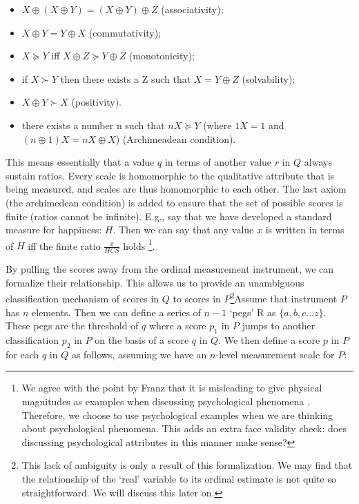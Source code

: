 \documentclass[utf8]{FrontiersinVancouver}
\begin{document}
\begin{itemize}
    \item $X \oplus (X \oplus Y) = (X \oplus Y) \oplus Z$ (associativity);
    \item $X \oplus Y = Y \oplus X$ (commutativity);
    \item $X \succeq Y$ iff $X \oplus Z \succeq Y \oplus Z$ (monotonicity);
    \item if $X \succ Y$ then there exists a Z such that $X = Y \oplus Z$ (solvability);
    \item $X \oplus Y \succ X$ (positivity).
    \item there exists a number n such that $nX \succeq Y$ (where $1X = 1$ and $(n \oplus 1) X = nX \oplus X$) (Archimeadean condition).
\end{itemize}

This means essentially that a value $q$ in terms of another value $r$ in $Q$ always sustain ratios. Every scale is homomorphic to the qualitative attribute that is being measured, and scales are thus homomorphic to each other. The last axiom (the archimedean condition) is added to ensure that the set of possible scores is finite (ratios cannot be infinite). E.g., say that we have developed a standard measure for happiness: $H$. Then we can say that any value $x$ is written in terms of $H$ iff the finite ratio $\frac{x}{HCS}$ holds \footnote{We agree with the point by Franz that it is misleading to give physical magnitudes as examples when discussing psychological phenomena \citep{franzArePsychologicalAttributes2022}. Therefore, we choose to use psychological examples when we are thinking about psychological phenomena. This adds an extra face validity check: does discussing psychological attributes in this manner make sense?}.

By pulling the scores away from the ordinal measurement instrument, we can formalize their relationship. This allows us to provide an unambiguous classification mechanism of scores in $Q$ to scores in $P$\footnote{This lack of ambiguity is only a result of this formalization. We may find that the relationship of the `real' variable to its ordinal estimate is not quite so straightforward. We will discuss this later on.}Assume that instrument $P$ has $n$ elements. Then we can define a series of $n - 1$ `pegs' R as $\{ a, b, c \ldots z \}$. These pegs are the threshold of $q$ where a score $p_1$ in $P$ jumps to another classification $p_2$ in $P$ on the basis of a score $q$ in $Q$. We then define a score $p$ in $P$ for each $q$ in $Q$ as follows, assuming we have an $n$-level measurement scale for $P$:
\end{document}
